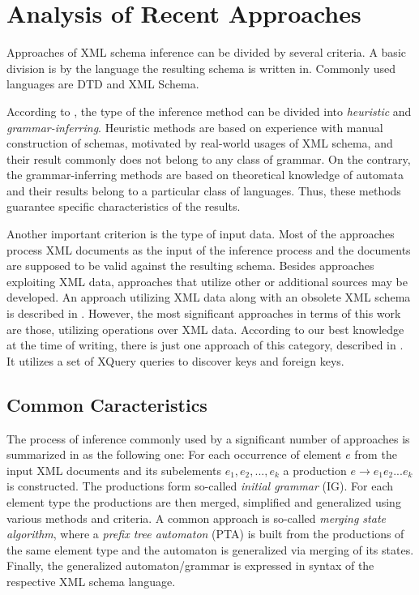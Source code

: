 \chapter{Analysis of Recent Approaches} \label{chapter_analysis_of_recent_approaches}
Approaches of XML schema inference can be divided by several criteria. A basic division is by the language the resulting schema is written in. Commonly used languages are DTD and XML Schema.

According to \cite{Mlynkova:2008:AAX:1494650.1495496}, the type of the inference method can be divided into \emph{heuristic} and \emph{grammar-inferring}. Heuristic methods are based on experience with manual construction of schemas, motivated by real-world usages of XML schema, and their result commonly does not belong to any class of grammar. On the contrary, the grammar-inferring methods are based on theoretical knowledge of automata and their results belong to a particular class of languages. Thus, these methods guarantee specific characteristics of the results. 

Another important criterion is the type of input data. Most of the approaches process XML documents as the input of the inference process and the documents are supposed to be valid against the resulting schema. Besides approaches exploiting XML data, approaches that utilize other or additional sources may be developed. An approach utilizing XML data along with an obsolete XML schema is described in \cite{Mlynkova:2009:IXS:1862681.1862693}. However, the most significant approaches in terms of this work are those, utilizing operations over XML data. According to our best knowledge at the time of writing, there is just one approach of this category, described in \cite{Necasky:2009:DXK:1529282.1529414}. It utilizes a set of XQuery queries to discover keys and foreign keys.

\section{Common Caracteristics}
The process of inference commonly used by a significant number of approaches is summarized in \cite{Mlynkova:2008:AAX:1494650.1495496} as the following one: For each occurrence of element $e$ from the input XML documents and its subelements $e_1, e_2, ..., e_k$ a production $e \rightarrow e_1 e_2 ... e_k$ is constructed. The productions form so-called \emph{initial grammar} (IG). For each element type the productions are then merged, simplified and generalized using various methods and criteria. A common approach is so-called \emph{merging state algorithm}, where a \emph{prefix tree automaton} (PTA) is built from the productions of the same element type and the automaton is generalized via merging of its states. Finally, the generalized automaton/grammar is expressed in syntax of the respective XML schema language.

